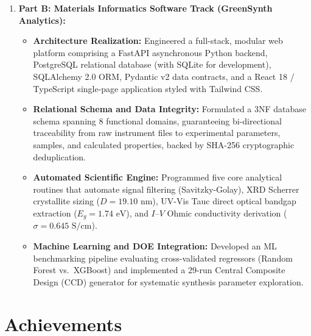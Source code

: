 \documentclass[12pt,a4paper,oneside]{report}
\begin{document}
{{{\begin{enumerate}
    \item \textbf{Part B: Materials Informatics Software Track (GreenSynth Analytics):}
    \begin{itemize}
        \item \textbf{Architecture Realization:} Engineered a full-stack, modular web platform comprising a FastAPI asynchronous Python backend, PostgreSQL relational database (with SQLite for development), SQLAlchemy 2.0 ORM, Pydantic v2 data contracts, and a React 18 / TypeScript single-page application styled with Tailwind CSS.
        \item \textbf{Relational Schema and Data Integrity:} Formulated a 3NF database schema spanning 8 functional domains, guaranteeing bi-directional traceability from raw instrument files to experimental parameters, samples, and calculated properties, backed by SHA-256 cryptographic deduplication.
        \item \textbf{Automated Scientific Engine:} Programmed five core analytical routines that automate signal filtering (Savitzky-Golay), XRD Scherrer crystallite sizing ($D = 19.10\text{ nm}$), UV-Vis Tauc direct optical bandgap extraction ($E_g = 1.74\text{ eV}$), and $I\text{--}V$ Ohmic conductivity derivation ($\sigma = 0.645\text{ S/cm}$).
        \item \textbf{Machine Learning and DOE Integration:} Developed an ML benchmarking pipeline evaluating cross-validated regressors (Random Forest vs.\ XGBoost) and implemented a 29-run Central Composite Design (CCD) generator for systematic synthesis parameter exploration.
    \end{itemize}
\end{enumerate}

\section{Achievements}

}}}
\end{document}
